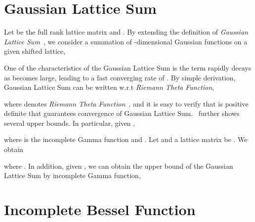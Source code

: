 \documentclass[nohyperref]{article}
\theoremstyle{plain}
\theoremstyle{definition}
\theoremstyle{remark}
\begin{document}




\newpage
\appendix
\onecolumn

\section{Gaussian Lattice Sum}
\label{gls}
Let  be the full rank lattice matrix and . By extending the definition of \textit{Gaussian Lattice Sum}~\citep{gaussian}, we consider a summation of -dimensional Gaussian functions on a given shifted lattice,

One of the characteristics of the Gaussian Lattice Sum is the term  rapidly decays as  becomes large, leading to a fast converging rate of . By simple derivation, Gaussian Lattice Sum can be written w.r.t \textit{Riemann Theta Function},

where  denotes \textit{Riemann Theta Function}~\citep{riemann}, and it is easy to verify that  is positive definite that guarantees convergence of Gaussian Lattice Sum.~\citet{riemann} further shows several upper bounds. In particular, given ,

where  is the incomplete Gamma function and . Let  and a lattice matrix be . We obtain 

where . In addition, given , we can obtain the upper bound of the Gaussian Lattice Sum by incomplete Gamma function,




\section{Incomplete Bessel Function}
\end{document}
